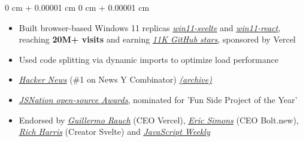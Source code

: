 \documentclass[10pt, a4paper]{article}
\newenvironment{highlights}{ \begin{itemize}[ topsep=0.10 cm, parsep=0.10 cm, partopsep=0pt,
itemsep=0pt, leftmargin=0 cm + 10pt ] }{ \end{itemize} } %
\newenvironment{onecolentry}{ \begin{adjustwidth}{ 0 cm + 0.00001 cm }{ 0 cm + 0.00001 cm }
}{ \end{adjustwidth} } %
\newenvironment{twocolentry}[2][]{ \onecolentry \def\secondColumn{#2} \setcolumnwidth{\fill, 4.5 cm}
\begin{paracol}{2} }{ \switchcolumn \raggedleft \secondColumn \end{paracol}
\endonecolentry } %
\begin{document}
	\begin{onecolentry}
		\begin{highlights}
			\item Built browser-based Windows 11 replicas \href{https://win11.yashash.com/}{\underline{\textit{win11-svelte}}}
			and \href{https://win11.blueedge.me}{\underline{\textit{win11-react}}},
			reaching \textbf{20M+ visits} and earning \href{https://github.com/yashash-pugalia}{\underline{\textit{11K GitHub stars}}},
			sponsored by Vercel

			\item Used code splitting via dynamic imports to optimize load performance

			\item \href{https://news.ycombinator.com/item?id=35896505}{\underline{\textit{Hacker News}}}
			(\#1 on News Y Combinator)
			\href{https://web.archive.org/web/20230511060851/https://news.ycombinator.com/}{\underline{\textit{(archive)}}}

			\item \href{https://youtu.be/V3FzeG3OneI}{\underline{\textit{JSNation open-source Awards}}},
			nominated for 'Fun Side Project of the Year'

			\item Endorsed by \href{https://x.com/rauchg/status/1656493176088150017}{\underline{\textit{Guillermo Rauch}}}
			(CEO Vercel),
			\href{https://x.com/EricSimons/status/1656644824190308352}{\underline{\textit{Eric Simons}}}
			(CEO Bolt.new), \href{https://x.com/Rich_Harris/status/1657097805733715987}{\underline{\textit{Rich Harris}}}
			(Creator Svelte) and \href{https://javascriptweekly.com/issues/638#:~:text=Fake-,Windows%2011,-in%20Svelte%20%E2%80%94%20This}{\underline{\textit{JavaScript Weekly}}}
		\end{highlights}
	\end{onecolentry}

\end{document}
